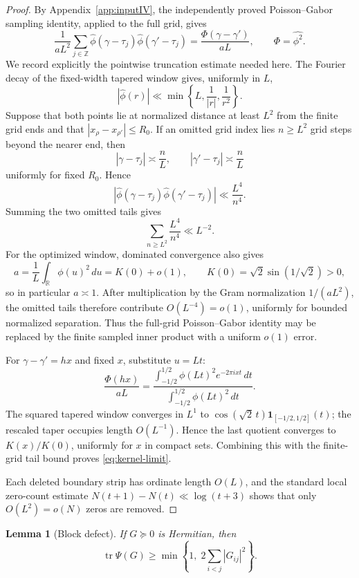 \documentclass[11pt]{article}
\newtheorem{lemma}[theorem]{Lemma}
\DeclareMathOperator{\tr}{tr}
\newcommand{\R}{\mathbb R}
\begin{document}
\begin{proof}
By Appendix~\ref{app:inputIV}, the independently proved Poisson--Gabor
sampling identity, applied to the full grid, gives
\[
 \frac1{aL^2}\sum_{j\in\mathbb Z}
 \widehat\phi(\gamma-\tau_j)\widehat\phi(\gamma'-\tau_j)
 =\frac{\Phi(\gamma-\gamma')}{aL},
 \qquad \Phi=\widehat{\phi^2}.
\]
We record explicitly the pointwise truncation estimate needed here.  The
Fourier decay of the fixed-width tapered window gives, uniformly in $L$,
\[
 |\widehat\phi(r)|\ll
 \min\left\{L,\frac1{|r|},\frac1{r^2}\right\}.
\]
Suppose that both points lie at normalized distance at least $L^2$ from the
finite grid ends and that $|x_\rho-x_{\rho'}|\le R_0$.  If an omitted grid
index lies $n\ge L^2$ grid steps beyond the nearer end, then
\[
 |\gamma-\tau_j|\asymp \frac nL,\qquad
 |\gamma'-\tau_j|\asymp \frac nL
\]
uniformly for fixed $R_0$.  Hence
\[
 |\widehat\phi(\gamma-\tau_j)
   \widehat\phi(\gamma'-\tau_j)|
 \ll \frac{L^4}{n^4}.
\]
Summing the two omitted tails gives
\[
 \sum_{n\ge L^2}\frac{L^4}{n^4}\ll L^{-2}.
\]
For the optimized window, dominated convergence also gives
\[
 a=\frac1L\int_{\R}\phi(u)^2\,du
   =K(0)+o(1),
 \qquad K(0)=\sqrt2\sin(1/\sqrt2)>0,
\]
so in particular $a\asymp1$.  After multiplication by the Gram normalization
$1/(aL^2)$, the omitted tails therefore contribute $O(L^{-4})=o(1)$,
uniformly for bounded normalized separation.  Thus the
full-grid Poisson--Gabor identity may be replaced by the finite sampled inner
product with a uniform $o(1)$ error.

For $\gamma-\gamma'=hx$ and fixed $x$, substitute $u=Lt$:
\[
 \frac{\Phi(hx)}{aL}
 =
 \frac{\displaystyle\int_{-1/2}^{1/2}
       \phi(Lt)^2e^{-2\pi ixt}\,dt}
      {\displaystyle\int_{-1/2}^{1/2}\phi(Lt)^2\,dt}.
\]
The squared tapered window converges in $L^1$ to
$\cos(\sqrt2\,t)\mathbf1_{[-1/2,1/2]}(t)$; the rescaled taper occupies
length $O(L^{-1})$.  Hence the last quotient converges to $K(x)/K(0)$,
uniformly for $x$ in compact sets.  Combining this with the finite-grid tail
bound proves \eqref{eq:kernel-limit}.

Each deleted boundary strip has ordinate length $O(L)$, and the standard local
zero-count estimate $N(t+1)-N(t)\ll\log(t+3)$ shows that only $O(L^2)=o(N)$
zeros are removed.
\end{proof}

\begin{lemma}[Block defect]\label{lem:block}
If $G\succeq0$ is Hermitian, then
\begin{equation}\label{eq:block}
 \tr\Psi(G)\ge
 \min\left\{1,\;2\sum_{i<j}|G_{ij}|^2\right\}.
\end{equation}
\end{lemma}
\end{document}
